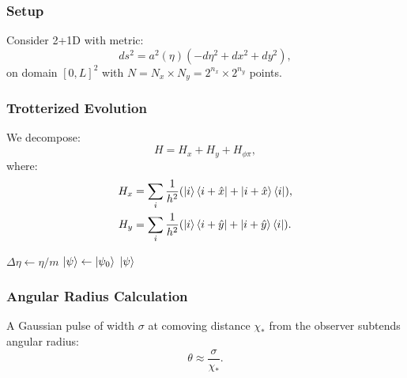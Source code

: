 \documentclass[11pt,a4paper]{article}
\theoremstyle{plain}
\theoremstyle{definition}
\theoremstyle{remark}
\begin{document}
\subsubsection{Setup}

Consider 2+1D with metric:
\begin{equation}
    ds^2 = a^2(\eta)(-d\eta^2 + dx^2 + dy^2),
\end{equation}
on domain $[0, L]^2$ with $N = N_x \times N_y = 2^{n_x} \times 2^{n_y}$ points.

\subsubsection{Trotterized Evolution}

We decompose:
\begin{equation}
    H = H_x + H_y + H_{\phi\pi},
\end{equation}
where:
\begin{align}
    H_x &= \sum_i \frac{1}{h^2}(\ket{i}\bra{i+\hat{x}} + \ket{i+\hat{x}}\bra{i}),\\
    H_y &= \sum_i \frac{1}{h^2}(\ket{i}\bra{i+\hat{y}} + \ket{i+\hat{y}}\bra{i}).
\end{align}

\begin{algorithm}[H]
\caption{2+1D Trotter Evolution}
\label{alg:2d_trotter}
$\Delta\eta \gets \eta / m$\;
$\ket{\psi} \gets \ket{\psi_0}$\;
\Return $\ket{\psi}$\;
\end{algorithm}

\subsubsection{Angular Radius Calculation}

A Gaussian pulse of width $\sigma$ at comoving distance $\chi_*$ from the observer subtends angular radius:
\begin{equation}\label{eq:angular_radius}
    \theta \approx \frac{\sigma}{\chi_*}.
\end{equation}
\end{document}
